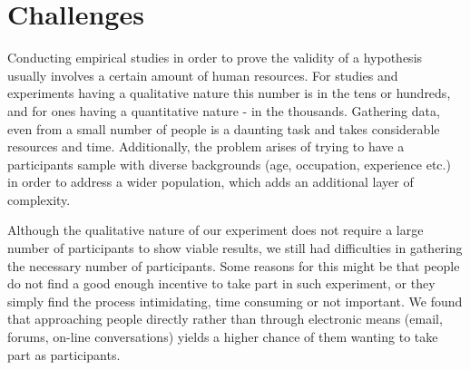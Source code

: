 \chapter{Challenges}
\label{chap:challenges}

Conducting empirical studies in order to prove the validity of a hypothesis usually involves a certain amount of human resources. For studies and experiments having a qualitative nature this number is in the tens or hundreds, and for ones having a quantitative nature - in the thousands. Gathering data, even from a small number of people is a daunting task and takes considerable resources and time. Additionally, the problem arises of trying to have a participants sample with diverse backgrounds (age, occupation, experience etc.) in order to address a wider population, which adds an additional layer of complexity. 

Although the qualitative nature of our experiment does not require a large number of participants to show viable results, we still had difficulties in gathering the necessary number of participants. Some  reasons for this might be that people do not find a good enough incentive to take part in such experiment, or they simply find the process intimidating, time consuming or not important. We found that approaching people directly rather than through electronic means (email, forums, on-line conversations) yields a higher chance of them wanting to take part as participants. 
